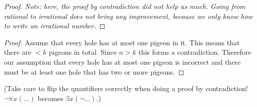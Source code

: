 \begin{solutions}
\begin{itemize}
\begin{proof}
		\emph{Note: here, the proof by contradiction did not help as much. Going from rational to irrational does not bring any improvement, because we only know how  to write an irrational number.}
	\end{proof}
	
\end{itemize}
	
	
\setcounter{solutioncounter}{2}
\solution
\begin{proof}
	Assume that every hole has at most one pigeon in it.
	This means that there are $< k$ pigeons in total. Since $n > k$ this forms a contradiction. Therefore our assumption
	that every hole has at most one pigeon is incorrect and there must be at least one hole that has two or more pigeons.
\end{proof}
(Take care to flip the quantifiers correctly when doing a proof by contradiction! $\neg \forall x(\dots)$ becomes $\exists
x(\neg \dots)$.)

\end{solutions}
